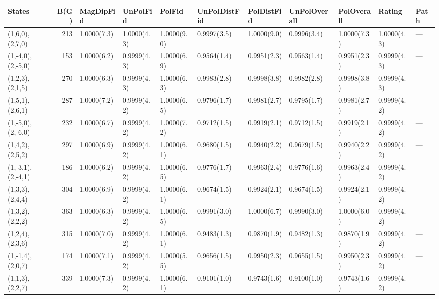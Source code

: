 \begin{tabular}{lrlllllllll}
\hline
 States             &   B(G) & MagDipFid   & UnPolFid    & PolFid      & UnPolDistFid   & PolDistFid   & UnPolOverall   & PolOverall   & Rating      & Path   \\
\hline
 (1,6,0),(2,7,0)    &    213 & 1.0000(7.3) & 1.0000(4.3) & 1.0000(9.0) & 0.9997(3.5)    & 1.0000(9.0)  & 0.9996(3.4)    & 1.0000(7.3)  & 1.0000(4.3) & ---    \\
 (1,-4,0),(2,-5,0)  &    153 & 1.0000(6.2) & 0.9999(4.3) & 1.0000(6.9) & 0.9564(1.4)    & 0.9951(2.3)  & 0.9563(1.4)    & 0.9951(2.3)  & 0.9999(4.3) & ---    \\
 (1,2,3),(2,1,5)    &    270 & 1.0000(6.3) & 0.9999(4.3) & 1.0000(6.3) & 0.9983(2.8)    & 0.9998(3.8)  & 0.9982(2.8)    & 0.9998(3.8)  & 0.9999(4.3) & ---    \\
 (1,5,1),(2,6,1)    &    287 & 1.0000(7.2) & 0.9999(4.2) & 1.0000(6.5) & 0.9796(1.7)    & 0.9981(2.7)  & 0.9795(1.7)    & 0.9981(2.7)  & 0.9999(4.2) & ---    \\
 (1,-5,0),(2,-6,0)  &    232 & 1.0000(6.7) & 0.9999(4.2) & 1.0000(7.2) & 0.9712(1.5)    & 0.9919(2.1)  & 0.9712(1.5)    & 0.9919(2.1)  & 0.9999(4.2) & ---    \\
 (1,4,2),(2,5,2)    &    297 & 1.0000(6.9) & 0.9999(4.2) & 1.0000(6.1) & 0.9680(1.5)    & 0.9940(2.2)  & 0.9679(1.5)    & 0.9940(2.2)  & 0.9999(4.2) & ---    \\
 (1,-3,1),(2,-4,1)  &    186 & 1.0000(6.2) & 0.9999(4.2) & 1.0000(6.5) & 0.9776(1.7)    & 0.9963(2.4)  & 0.9776(1.6)    & 0.9963(2.4)  & 0.9999(4.2) & ---    \\
 (1,3,3),(2,4,4)    &    304 & 1.0000(6.9) & 0.9999(4.2) & 1.0000(6.1) & 0.9674(1.5)    & 0.9924(2.1)  & 0.9674(1.5)    & 0.9924(2.1)  & 0.9999(4.2) & ---    \\
 (1,3,2),(2,2,2)    &    363 & 1.0000(6.3) & 0.9999(4.2) & 1.0000(6.5) & 0.9991(3.0)    & 1.0000(6.7)  & 0.9990(3.0)    & 1.0000(6.0)  & 0.9999(4.2) & ---    \\
 (1,2,4),(2,3,6)    &    315 & 1.0000(7.0) & 0.9999(4.2) & 1.0000(6.1) & 0.9483(1.3)    & 0.9870(1.9)  & 0.9482(1.3)    & 0.9870(1.9)  & 0.9999(4.2) & ---    \\
 (1,-1,4),(2,0,7)   &    174 & 1.0000(7.1) & 0.9999(4.2) & 1.0000(5.5) & 0.9656(1.5)    & 0.9950(2.3)  & 0.9655(1.5)    & 0.9950(2.3)  & 0.9999(4.2) & ---    \\
 (1,1,3),(2,2,7)    &    339 & 1.0000(7.3) & 0.9999(4.2) & 1.0000(6.1) & 0.9101(1.0)    & 0.9743(1.6)  & 0.9100(1.0)    & 0.9743(1.6)  & 0.9999(4.2) & ---    \\

\end{tabular}
